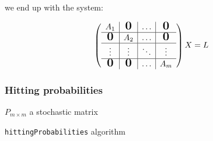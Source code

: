 \begin{frame}
    \fontsize{10pt}{0}\selectfont\bigskip
    
    we end up with the system: \bigskip
    
    \[
    \left(\begin{array}{c|c|c|c}
    A_1 & \mbox{\normalfont\Large\bfseries 0} & \ldots & \mbox{\normalfont\Large\bfseries 0} \\
    \hline
    \mbox{\normalfont\Large\bfseries 0} & A_2 & \ldots & \mbox{\normalfont\Large\bfseries 0} \\
    \hline
    \vdots & \vdots & \ddots & \vdots \\
    \hline
    \mbox{\normalfont\Large\bfseries 0} & \mbox{\normalfont\Large\bfseries 0} & \ldots & A_m
    \end{array}\right) X = L
    \]

\end{frame}

\begin{frame} \frametitle{Hitting probabilities}
    \vspace{2em}
    
    \begin{algorithm}[H]
    \begin{algorithmic}[1]
    \REQUIRE $P_{m \times m}$ a stochastic matrix
    \NEWLINE
    \NEWLINE
        \NEWLINE
            \ENDFOR
        \ENDIF
        \ENDFOR
    \ENDFOR
    \end{algorithmic}
    \caption{\texttt{hittingProbabilities} algorithm}
    \label{alg:hittingProbs}
    \end{algorithm}
 
\end{frame}

